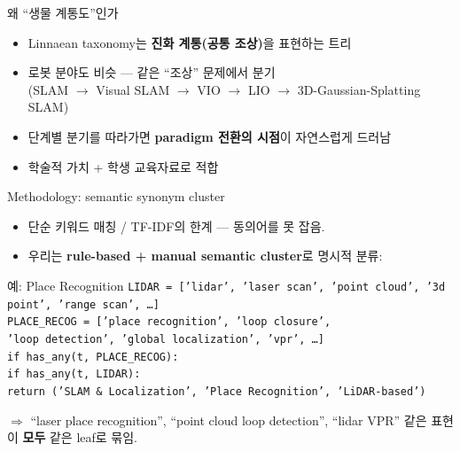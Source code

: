 \documentclass[aspectratio=169,t]{beamer}
\newcommand{\hot}[1]{\textcolor{accentorange}{\textbf{#1}}}
\newcommand{\cool}[1]{\textcolor{accentblue}{\textbf{#1}}}
\newcommand{\muted}[1]{\textcolor{mutedgray}{#1}}
\begin{document}
\begin{frame}{왜 ``생물 계통도''인가}
\begin{itemize}
  \item Linnaean taxonomy는 \hot{진화 계통(공통 조상)}을 표현하는 트리
  \item 로봇 분야도 비슷 — 같은 ``조상'' 문제에서 분기 \\
        \muted{(SLAM $\to$ Visual SLAM $\to$ VIO $\to$ LIO $\to$ 3D-Gaussian-Splatting SLAM)}
  \item 단계별 분기를 따라가면 \cool{paradigm 전환의 시점}이 자연스럽게 드러남
  \item 학술적 가치 + 학생 교육자료로 적합
\end{itemize}
\end{frame}

\begin{frame}{Methodology: semantic synonym cluster}
\begin{itemize}
  \item 단순 키워드 매칭 / TF-IDF의 한계 — 동의어를 못 잡음.
  \item 우리는 \hot{rule-based + manual semantic cluster}로 명시적 분류:
\end{itemize}
\vfill
\begin{block}{예: Place Recognition}
\small
\texttt{LIDAR = ['lidar', 'laser scan', 'point cloud', '3d point', 'range scan', \dots]} \\
\texttt{PLACE\_RECOG = ['place recognition', 'loop closure',} \\
\texttt{\quad\quad'loop detection', 'global localization', 'vpr', \dots]}\\[6pt]
\texttt{if has\_any(t, PLACE\_RECOG):} \\
\texttt{\quad if has\_any(t, LIDAR):} \\
\texttt{\quad\quad return ('SLAM \& Localization', 'Place Recognition', 'LiDAR-based')}
\end{block}
\vfill
\muted{$\Rightarrow$ ``laser place recognition'', ``point cloud loop detection'', ``lidar VPR''
같은 표현이 \cool{모두} 같은 leaf로 묶임.}
\end{frame}
\end{document}
